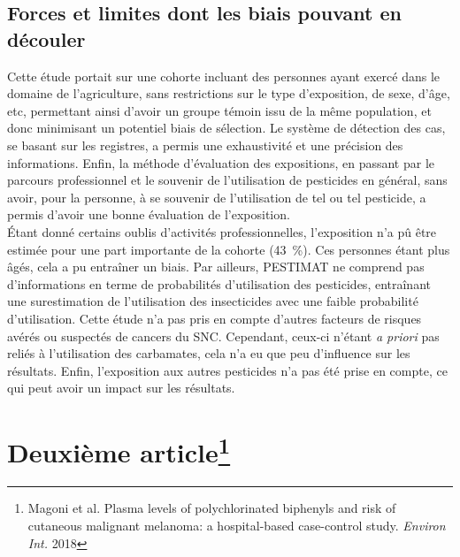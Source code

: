 \documentclass[10pt]{article}
\begin{document}
\subsection{Forces et limites dont les biais pouvant en découler}
Cette étude portait sur une cohorte incluant des personnes ayant exercé dans le domaine de l'agriculture, sans restrictions sur le type d'exposition, de sexe, d'âge, etc, permettant ainsi d'avoir un groupe témoin issu de la même population, et donc minimisant un potentiel biais de sélection. Le système de détection des cas, se basant sur les registres, a permis une exhaustivité et une précision des informations. Enfin, la méthode d'évaluation des expositions, en passant par le parcours professionnel et le souvenir de l'utilisation de pesticides en général, sans avoir, pour la personne, à se souvenir de l'utilisation de tel ou tel pesticide, a permis d'avoir une bonne évaluation de l'exposition.\\

\'{E}tant donné certains oublis d'activités professionnelles, l'exposition n'a pû être estimée pour une part importante de la cohorte (43~\%). Ces personnes étant plus âgés, cela a pu entraîner un biais. Par ailleurs, PESTIMAT ne comprend pas d'informations en terme de probabilités d'utilisation des pesticides, entraînant une surestimation de l'utilisation des insecticides avec une faible probabilité d'utilisation. Cette étude n'a pas pris en compte d'autres facteurs de risques avérés ou suspectés de cancers du SNC. Cependant, ceux-ci n'étant \emph{a priori} pas reliés à l'utilisation des carbamates, cela n'a eu que peu d'influence sur les résultats. Enfin, l'exposition aux autres pesticides n'a pas été prise en compte, ce qui peut avoir un impact sur les résultats. 

\newpage

\section{Deuxième article\protect\footnote{Magoni et al. Plasma levels of polychlorinated biphenyls and risk of cutaneous malignant melanoma: a hospital-based case-control study. \emph{Environ Int.} 2018}}
\end{document}
